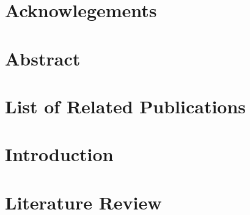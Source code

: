 \documentclass[11pt]{book}
\renewcommand{\baselinestretch}{1.2}
\begin{document}


\newpage
\thispagestyle{empty}
\renewcommand{\thesisdedication}{{\large Copyright \copyright~Devesh Marwah, 2025\\}{\large All Rights Reserved\\}}
\thesisdedicationpage


\mastersthesis
%
%
\chapter*{}
\label{ch:par}


\chapter*{Acknowlegements}
\label{ch:Acknowlegements}



\chapter*{Abstract}
\label{ch:abstract}


\tableofcontents
\listoffigures
\let\cleardoublepage\clearpage
\listoftables
\printglossary[type=\acronymtype,title=Abbreviations,nonumberlist]

\chapter*{List of Related Publications}
\label{ch:relatedPubs}


\chapter{Introduction}
\label{ch:intro}

\chapter{Literature Review}
\label{ch:lit_review}

\end{document}
